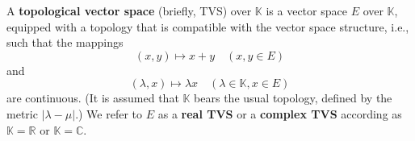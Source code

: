 A \textbf{topological vector space} (briefly, TVS) over $\mathbb{K}$ is a vector space $E$ over $\mathbb{K}$, equipped with a topology that is compatible with the vector space structure, i.e., such that the mappings
$$(x, y) \mapsto x + y \quad (x, y \in E)$$
and
$$(\lambda, x) \mapsto \lambda x \quad (\lambda \in \mathbb{K}, x \in E)$$
are continuous. (It is assumed that $\mathbb{K}$ bears the usual topology, defined by the metric $|\lambda - \mu|$.) We refer to $E$ as a \textbf{real TVS} or a \textbf{complex TVS} according as $\mathbb{K} = \mathbb{R}$ or $\mathbb{K} = \mathbb{C}$.
